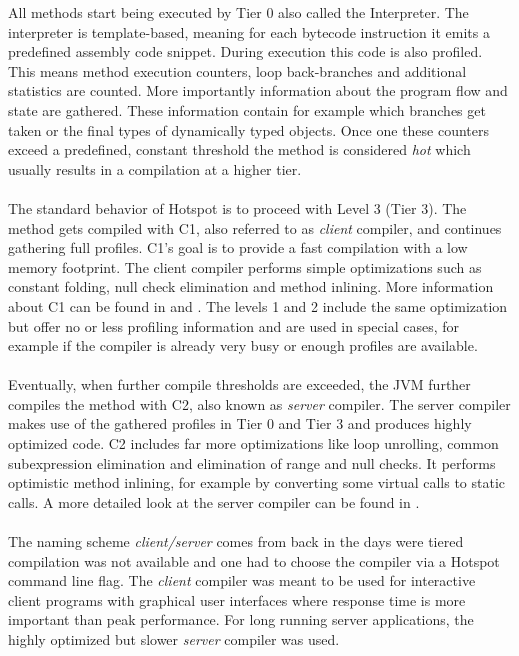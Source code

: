 All methods start being executed by Tier 0 also called the Interpreter.
The interpreter is template-based, meaning for each bytecode instruction it emits a predefined assembly code snippet.
During execution this code is also profiled. This means method execution counters, loop back-branches and additional statistics are counted. More importantly information about the program flow and state are gathered. These information contain for example which branches get taken or the final types of dynamically typed objects. Once one these counters exceed a predefined, constant threshold the method is considered \textit{hot} which usually results in a compilation at a higher tier.
\\\\
The standard behavior of Hotspot is to proceed with Level 3 (Tier 3). The method gets compiled with C1, also referred to as \textit{client} compiler, and continues gathering full profiles.
C1's goal is to provide a fast compilation with a low memory footprint.
The client compiler performs simple optimizations such as constant folding, null check elimination and method inlining.
More information about C1 can be found in \cite{client_compiler_talk} and \cite{client_compiler}.
The levels 1 and 2 include the same optimization but offer no or less profiling information and are used in special cases, for example if the compiler is already very busy or enough profiles are available.
\\\\
Eventually, when further compile thresholds are exceeded, the JVM further compiles the method with C2, also known as \textit{server} compiler.
The server compiler makes use of the gathered profiles in Tier 0 and Tier 3 and produces highly optimized code. C2 includes far more optimizations like loop unrolling, common subexpression elimination and elimination of range and null checks. It performs optimistic method inlining, for example by converting some virtual calls to static calls.
A more detailed look at the server compiler can be found in \cite{server_compiler}.
\\\\
The naming scheme \textit{client/server} comes from back in the days were tiered compilation was not available and one had to choose the compiler via a Hotspot command line flag. The \textit{client} compiler was meant to be used for interactive client programs with graphical user interfaces where response time is more important than peak performance. For long running server applications, the highly optimized but slower \textit{server} compiler was used. 
